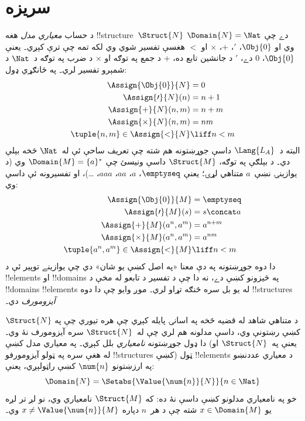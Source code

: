 \documentclass[../../../include/open-logic-section]{subfiles}
\begin{document}
\section{سريزه}

د حساب \emph{معياري مدل} هغه !!{structure}~$\Struct{N}$ دے چې
$\Domain{N} = \Nat$ وي او $\Obj{0}$، $\prime$، $+$، $\times$ او $<$
هغسې تفسير شوي وي لکه تمه چې ترې کېږي۔ يعنې $\Obj{0}$، $0$ دے،
$\prime$ د جانشين تابع ده، $+$ د جمع په توګه او $\times$ د ضرب په
توګه د~$\Nat$ د شمېرو تفسير لري۔ په ځانګړي ډول:
\begin{align*}
  \Assign{\Obj{0}}{N} & = 0\\
  \Assign{\prime}{N}(n) & = n + 1\\
  \Assign{+}{N}(n, m) & = n + m\\
  \Assign{\times}{N}(n, m) & = nm\\
  \tuple{n,m}\in\Assign{<}{N} & \liff n<m
\end{align*}
البته د~$\Lang{L_A}$ داسې جوړښتونه هم شته چې تعريف ساحې ئې له~$\Nat$
څخه بېلې دي۔ د بېلګې په توګه، $\Struct{M}$ داسې ونيسئ چې
$\Domain{M} = \{a\}^*$ وي (د يوازېنۍ نښې~$a$ متناهي لړۍ؛ يعنې
$\emptyseq$، $a$، $aa$، $aaa$، \dots)، او تفسيرونه ئې داسې وي:
\begin{align*}
  \Assign{\Obj{0}}{M} & = \emptyseq\\
  \Assign{\prime}{M}(s) & = s \concat a\\
  \Assign{+}{M}(a^n, a^m) & = a^{n + m}\\
  \Assign{\times}{M}(a^n, a^m) & = a^{nm}\\
  \tuple{a^n,a^m}\in\Assign{<}{M} & \liff n<m
\end{align*}
دا دوه جوړښتونه په دې معنا «په اصل کښې يو شان» دي چې يوازينے
توپير ئې د !!{element}s او !!{domain}s په څيزونو کښې دے، نه دا چې
د تفسير د تابعو له مخې د !!{domain}s !!{element}s له يو بل سره څنګه تړاو لري۔
موږ وايو چې دا دوه !!{structure}s \emph{آيزومورف} دي۔

د متناهي شاهد له قضيه څخه په اسانۍ پايله کېږي چې هره تيوري چې په
$\Struct{N}$ کښې رښتونې وي، داسې مدلونه هم لري چې له~$\Struct{N}$ سره
آيزومورف نۀ وي۔ دا ډول جوړښتونه \emph{نامعياري} بلل کېږي۔ په معياري
مدل کښې (يعنې په~$\Struct{N}$ او له هغې سره په ټولو آيزومورفو
!!{structure}s کښې) ټول !!{element}s د معياري عددنښو په ارزښتونو
$\num{n}$ کښې راټولېږي، يعنې:
\[
\Domain{N} = \Setabs{\Value{\num{n}}{N}}{n \in \Nat}
\]
خو په نامعياري مدلونو کښې داسې نۀ ده: که $\Struct{M}$ نامعياري وي، نو
لږ تر لږه يو $x \in \Domain{M}$ شته چې د هر~$n$ دپاره
$x \neq \Value{\num{n}}{M}$ وي۔
\end{document}
